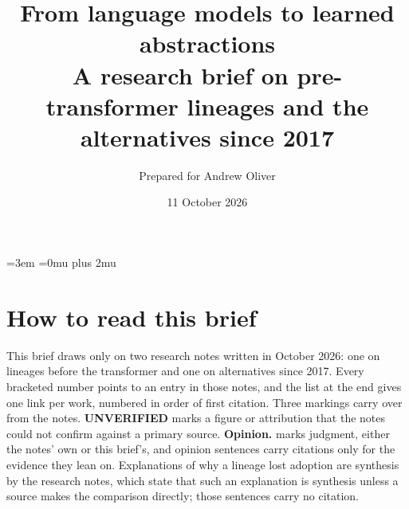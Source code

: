 
\usepackage{amsmath,amssymb}
\usepackage{xurl}
\usepackage{multicol}
\usepackage{needspace}

\emergencystretch=3em
\Urlmuskip=0mu plus 2mu

\newcommand{\unverified}{\textbf{UNVERIFIED}}
\newcommand{\opinion}{\textbf{Opinion.}}

\title{From language models to learned abstractions\\\large A research brief on pre-transformer lineages and the alternatives since 2017}
\author{Prepared for Andrew Oliver}
\date{11 October 2026}
\maketitle


\section{How to read this brief}
This brief draws only on two research notes written in October 2026: one on lineages before the transformer and one on alternatives since 2017. Every bracketed number points to an entry in those notes, and the list at the end gives one link per work, numbered in order of first citation. Three markings carry over from the notes. \unverified{} marks a figure or attribution that the notes could not confirm against a primary source. \opinion{} marks judgment, either the notes' own or this brief's, and opinion sentences carry citations only for the evidence they lean on. Explanations of why a lineage lost adoption are synthesis by the research notes, which state that such an explanation is synthesis unless a source makes the comparison directly; those sentences carry no citation.

